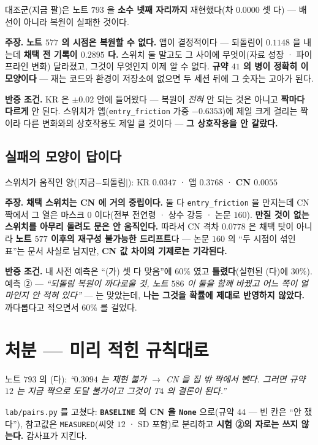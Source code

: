\documentclass[10pt,a4paper]{article}
\newcommand{\claim}[2]{\begin{claimbox}\textbf{주장.} #1\par\smallskip
  \textcolor{gray!70}{\textbf{반증 조건.} #2}\end{claimbox}}
\begin{document}
대조군(지금 팔)은 노트 $793$ 을 \textbf{소수 넷째 자리까지} 재현했다(차 $0.0000$
셋 다) --- 배선이 아니라 복원이 실패한 것이다.

\claim{\textbf{노트 $577$ 의 시점은 복원할 수 없다.} 앱이 결정적이다 --- 되돌림이
$0.1148$ 을 내는데 \textbf{채택 전 기록이 $0.2895$ 다.} 스위치 둘 말고도 그
사이에 무엇이(자료 성장 · 파이프라인 변화) 달라졌고, 그것이 무엇인지 이제 알 수
없다. \textbf{규약 $41$ 의 병이 정확히 이 모양이다} --- 재는 코드와 환경이
저장소에 없으면 두 세션 뒤에 그 숫자는 고아가 된다.}
{KR 은 $\pm 0.02$ 안에 들어왔다 --- 복원이 \emph{전혀} 안 되는 것은 아니고
\textbf{짝마다 다르게} 안 된다. 스위치가 앱(\texttt{entry\_friction} 가중
$-0.6353$)에 제일 크게 걸리는 짝이라 다른 변화와의 상호작용도 제일 클 것이다 ---
\textbf{그 상호작용을 안 갈랐다.}}

\subsection*{실패의 모양이 답이다}

\begin{center}
스위치가 움직인 양($|$지금$-$되돌림$|$): KR $0.0347$ · 앱 $\mathbf{0.3768}$ ·
\textbf{CN $0.0055$}
\end{center}

\claim{\textbf{채택 스위치는 CN 에 거의 중립이다.} 둘 다 \texttt{entry\_friction}
을 만지는데 CN 짝에서 그 열은 마스크 $0$ 이다(전부 전연령 · 상수 강등 · 논문
$160$). \textbf{만질 것이 없는 스위치를 아무리 돌려도 문은 안 움직인다.} 따라서
CN 격차 $0.0778$ 은 채택 탓이 아니라 \textbf{노트 $577$ 이후의 재구성 불가능한
드리프트}다 --- 논문 $160$ 의 ``두 시점이 섞인 표''는 문서 사실로 남지만,
\textbf{CN 값 차이의 기제로는 기각된다.}}
{내 사전 예측은 ``(가) 셋 다 맞음''에 $60\%$ 였고 \textbf{틀렸다}(실현된 (다)에
$30\%$). 예측 ② --- \emph{``되돌림 복원이 까다로울 것, 노트 $586$ 이 둘을 함께
바꿨고 어느 쪽이 얼마인지 안 적혀 있다''} --- 는 맞았는데, \textbf{나는 그것을
확률에 제대로 반영하지 않았다.} 까다롭다고 적으면서 $60\%$ 를 걸었다.}

\section{처분 --- 미리 적힌 규칙대로}

노트 $793$ 의 (다): \emph{``$0.3094$ 는 재현 불가 $\to$ CN 을 집 밖 짝에서 뺀다.
그러면 규약 $12$ 는 지금 짝으로 도달 불가이고 그것이 T$4$ 의 결론이 된다.''}

\texttt{lab/pairs.py} 를 고쳤다: \textbf{\texttt{BASELINE} 의 CN 을 \texttt{None}}
으로(규약 $44$ --- 빈 칸은 ``안 쟀다''), 참고값은 \texttt{MEASURED}(씨앗 $12$ ·
SD 포함)로 분리하고 \textbf{시험 ②의 자로는 쓰지 않는다.} 감사표가 지킨다.
\end{document}
